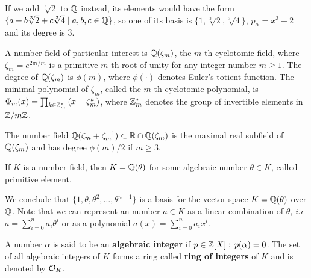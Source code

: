 \documentclass[a4paper,12pt]{article}
\begin{document}
\begin{example}
  If we add $\sqrt[3]{2}$ to $\mathbb{Q}$ instead, its elements would have the
  form $\{a + b\sqrt[3]{2} + c\sqrt[3]{4} \;|\; a,b,c \in \mathbb{Q}\}$, so one of
  its basis is $\{1 ,\sqrt[3]{2} ,\sqrt[3]{4}\}$, $p_\alpha = x^3 - 2$ and its degree
  is $3$.
\end{example}

\begin{example}\label{example:cyclotomic-number-field}
  A number field of particular interest is $\mathbb{Q}(\zeta_m)$, the $m$-th cyclotomic field,
  where $\zeta_m = e^{2\pi i /m}$ is a primitive $m$-th root of unity for any
  integer number $m \geq 1$. The degree of $\mathbb{Q}(\zeta_m)$ is $\phi(m)$, where $\phi(\cdot)$
  denotes Euler’s totient function. The minimal polynomial of $\zeta_m$, called
  the $m$-th cyclotomic polynomial, is $\Phi_m(x) = \prod_{k \in \mathbb{Z}_{m}^*}{(x-\zeta^k_m)}$, where $\mathbb{Z}^*_m$ denotes the group of invertible elements in $\mathbb{Z}/m\mathbb{Z}$.
\end{example}

\begin{example}
  \label{example:maximal-real-subfield}
  The number field $\mathbb{Q}(\zeta_m + \zeta_m^{-1}) \subset \mathbb{R} \cap \mathbb{Q}(\zeta_m)$ is the maximal real subfield of $\mathbb{Q}(\zeta_m)$ and has degree $\phi(m)/2$ if $m \geq 3$.
\end{example}

\begin{theorem}
   If $K$ is a number field, then $K = \mathbb{Q}(\theta)$ for some
  algebraic number $\theta \in K$, called primitive element.
\end{theorem}

\begin{text}
  We conclude that \(\{1, \theta, \theta^2, \dots , \theta^{n-1}\}\) is a basis for the vector
  space \(K = \mathbb{Q}(\theta)\) over \(\mathbb{Q}\). Note that we can represent an number \(a \in K\) as a linear combination of \(\theta\), \emph{i.e} \(a = \sum^n_{i=0}{a_i\theta^i}\) or as a polynomial \(a(x) = \sum^n_{i=0}{a_ix^i}\).

\end{text}

\begin{definition}
A number $\alpha$ is said to be an \textbf{algebraic integer} if $ p \in \mathbb{Z}[X] \;;\; p(\alpha) = 0$. The set of all algebraic integers of $K$ forms a ring called \textbf{ring of integers} of $K$ and is denoted by $\mathcal{O}_K$.
\end{definition}
\end{document}
